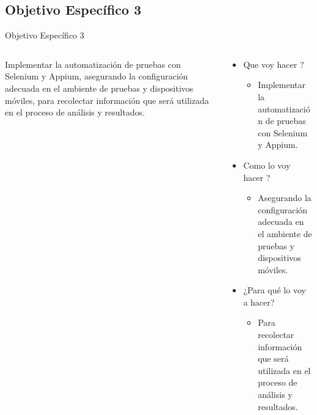 \documentclass{beamer}
\begin{document}
\subsection{Objetivo Específico 3}
\begin{frame}{Objetivo Específico 3 }
  \begin{columns}
    \begin{column}{0.5\textwidth}
    \justify
      Implementar la automatización de pruebas con Selenium y Appium, asegurando la configuración adecuada en el ambiente de pruebas y dispositivos móviles, para recolectar información que será utilizada en el proceso de análisis y resultados. 
    \end{column}
    \begin{column}{0.5\textwidth}
      \begin{itemize}
          \item Que voy hacer ?
          \begin{itemize}
              \item  Implementar la automatización de pruebas con Selenium y Appium.
          \end{itemize}
          \item Como lo voy hacer ?
          \begin{itemize}
              \item Asegurando la configuración adecuada en el ambiente de pruebas y dispositivos móviles.
          \end{itemize}
         \item ¿Para qué lo voy a hacer?
         \begin{itemize}
              \item Para recolectar información que será utilizada en el proceso de análisis y resultados.
          \end{itemize}
      \end{itemize}
    \end{column}
  \end{columns}
\end{frame}
\end{document}
